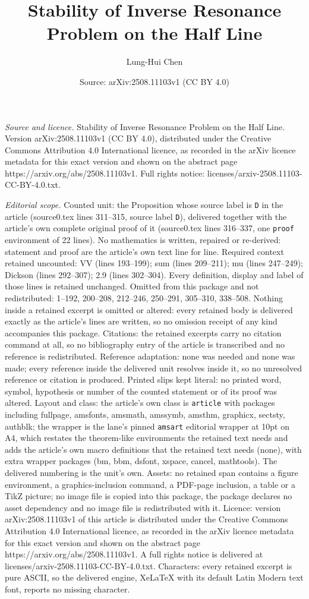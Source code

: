 \documentclass[10pt,a4paper]{amsart}
\title[Stability of Inverse Resonance Problem on the Half Line]{Stability of Inverse Resonance Problem on the Half Line}
\author{Lung-Hui Chen}
\date{Source: arXiv:2508.11103v1 (CC BY 4.0)}
\begin{document}
\maketitle

\noindent\emph{Source and licence.} Stability of Inverse Resonance Problem on the Half Line. Version arXiv:2508.11103v1 (CC BY 4.0), distributed under the Creative Commons Attribution 4.0 International licence, as recorded in the arXiv licence metadata for this exact version and shown on the abstract page https://arxiv.org/abs/2508.11103v1. Full rights notice: licenses/arxiv-2508.11103-CC-BY-4.0.txt.\par\smallskip

\noindent\textit{Editorial scope.} Counted unit: the Proposition whose source label is \texttt{D} in the article (source0.tex lines 311--315, source label \texttt{D}), delivered together with the article's own complete original proof of it (source0.tex lines 316--337, one \texttt{proof} environment of 22 lines). No mathematics is written, repaired or re-derived: statement and proof are the article's own text line for line. Required context retained uncounted: VV (lines 193--199); sum (lines 209--211); mu (lines 247--249); Dickson (lines 292--307); 2.9 (lines 302--304). Every definition, display and label of those lines is retained unchanged. Omitted from this package and not redistributed: 1--192, 200--208, 212--246, 250--291, 305--310, 338--508. Nothing inside a retained excerpt is omitted or altered: every retained body is delivered exactly as the article's lines are written, so no omission receipt of any kind accompanies this package. Citations: the retained excerpts carry no citation command at all, so no bibliography entry of the article is transcribed and no reference is redistributed. Reference adaptation: none was needed and none was made; every reference inside the delivered unit resolves inside it, so no unresolved reference or citation is produced. Printed slips kept literal: no printed word, symbol, hypothesis or number of the counted statement or of its proof was altered. Layout and class: the article's own class is \texttt{article} with packages including fullpage, amsfonts, amsmath, amssymb, amsthm, graphicx, sectsty, authblk; the wrapper is the lane's pinned \texttt{amsart} editorial wrapper at 10pt on A4, which restates the theorem-like environments the retained text needs and adds the article's own macro definitions that the retained text needs (none), with extra wrapper packages (bm, bbm, dsfont, xspace, cancel, mathtools). The delivered numbering is the unit's own. Assets: no retained span contains a figure environment, a graphics-inclusion command, a PDF-page inclusion, a table or a TikZ picture; no image file is copied into this package, the package declares no asset dependency and no image file is redistributed with it. Licence: version arXiv:2508.11103v1 of this article is distributed under the Creative Commons Attribution 4.0 International licence, as recorded in the arXiv licence metadata for this exact version and shown on the abstract page https://arxiv.org/abs/2508.11103v1. A full rights notice is delivered at licenses/arxiv-2508.11103-CC-BY-4.0.txt. Characters: every retained excerpt is pure ASCII, so the delivered engine, XeLaTeX with its default Latin Modern text font, reports no missing character.
\end{document}
